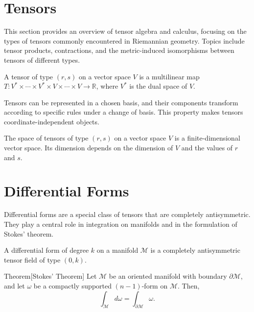 \section{Tensors}
\vspace{-0.7cm}
This section provides an overview of tensor algebra and calculus, focusing on the types of tensors commonly encountered in Riemannian geometry. Topics include tensor products, contractions, and the metric-induced isomorphisms between tensors of different types.

\begin{deff}
A tensor of type \( (r, s) \) on a vector space \( V \) is a multilinear map \( T: V^* \times \cdots \times V^* \times V \times \cdots \times V \to \mathbb{R} \), where \( V^* \) is the dual space of \( V \).
\end{deff}

\begin{oobs}
Tensors can be represented in a chosen basis, and their components transform according to specific rules under a change of basis. This property makes tensors coordinate-independent objects.
\end{oobs}

\begin{proposicao}
The space of tensors of type \( (r, s) \) on a vector space \( V \) is a finite-dimensional vector space. Its dimension depends on the dimension of \( V \) and the values of \( r \) and \( s \).
\end{proposicao}

\section{Differential Forms}
Differential forms are a special class of tensors that are completely antisymmetric. They play a central role in integration on manifolds and in the formulation of Stokes' theorem.

\begin{deff}
A differential form of degree \( k \) on a manifold \( \mathcal{M} \) is a completely antisymmetric tensor field of type \( (0, k) \).
\end{deff}

\begin{namedthm}{Theorem}[Stokes' Theorem]
Let \( \mathcal{M} \) be an oriented manifold with boundary \( \partial \mathcal{M} \), and let \( \omega \) be a compactly supported \( (n-1) \)-form on \( \mathcal{M} \). Then,
\[
\int_{\mathcal{M}} d\omega = \int_{\partial \mathcal{M}} \omega.
\]
\end{namedthm}

